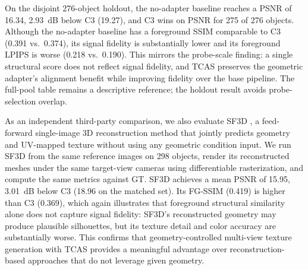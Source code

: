 \documentclass[times,twocolumn,final]{elsarticle}
\begin{document}
\begin{table}[t]
\centering
\caption{Comparison with the base pipeline (no adapter) on 300 objects. Values are absolute metrics of generated outputs with respect to ground truth. C3 wins on PSNR for 297/300 objects over the no-adapter baseline.}
\label{tab:300obj_noadapter}
\end{table}

On the disjoint 276-object holdout, the no-adapter baseline reaches a PSNR of 16.34, 2.93~dB below C3 (19.27), and C3 wins on PSNR for 275 of 276 objects. Although the no-adapter baseline has a foreground SSIM comparable to C3 (0.391 vs.\ 0.374), its signal fidelity is substantially lower and its foreground LPIPS is worse (0.218 vs.\ 0.190). This mirrors the probe-scale finding: a single structural score does not reflect signal fidelity, and TCAS preserves the geometric adapter's alignment benefit while improving fidelity over the base pipeline. The full-pool table remains a descriptive reference; the holdout result avoids probe-selection overlap.

As an independent third-party comparison, we also evaluate SF3D \cite{sf3d2024}, a feed-forward single-image 3D reconstruction method that jointly predicts geometry and UV-mapped texture without using any geometric condition input. We run SF3D from the same reference images on 298 objects, render its reconstructed meshes under the same target-view cameras using differentiable rasterization, and compute the same metrics against GT. SF3D achieves a mean PSNR of 15.95, 3.01~dB below C3 (18.96 on the matched set). Its FG-SSIM (0.419) is higher than C3 (0.369), which again illustrates that foreground structural similarity alone does not capture signal fidelity: SF3D's reconstructed geometry may produce plausible silhouettes, but its texture detail and color accuracy are substantially worse. This confirms that geometry-controlled multi-view texture generation with TCAS provides a meaningful advantage over reconstruction-based approaches that do not leverage given geometry.
\end{document}

